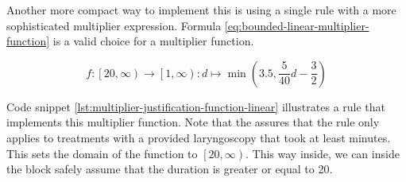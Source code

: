 \begin{center}
    \label{plot:multiplier-justification-step-function}
\end{center}

Another more compact way to implement this is using a single rule with a more sophisticated multiplier expression.
Formula \ref{eq:bounded-linear-multiplier-function} is a valid choice for a multiplier function.

\begin{equation}
    \label{eq:bounded-linear-multiplier-function}
    f: \left[20, \infty\right) \rightarrow \left[ 1, \infty \right) : d \mapsto \min\left( 3.5, \frac{5}{40} d - \frac{3}{2} \right)
\end{equation}


Code snippet \ref{lst:multiplier-justification-function-linear} illustrates a rule that implements this multiplier function.
Note that the  assures that the rule only applies to treatments with a provided laryngoscopy that took at least  minutes.
This sets the domain of the function to $\left[20, \infty\right)$.
This way inside, we can inside the  block safely assume that the duration is greater or equal to 20.




\begin{center}
\end{center}

